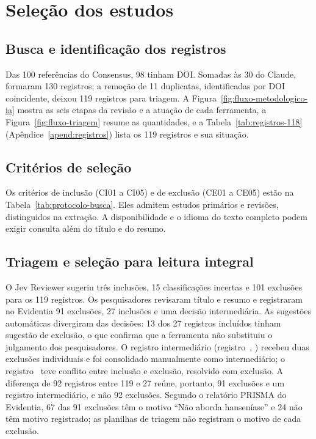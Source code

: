 \section{Seleção dos estudos}
\label{sec:execucao-busca-selecao}

\subsection{Busca e identificação dos registros}

Das 100 referências do Consensus, 98 tinham DOI. Somadas às 30 do Claude,
formaram 130 registros; a remoção de 11 duplicatas, identificadas por DOI
coincidente, deixou 119 registros para triagem. A
Figura~\ref{fig:fluxo-metodologico-ia} mostra as seis etapas da revisão e
a atuação de cada ferramenta, a Figura~\ref{fig:fluxo-triagem} resume as
quantidades, e a Tabela~\ref{tab:registros-118} (Apêndice~\ref{apend:registros}) lista os
119 registros e sua situação.

\subsection{Critérios de seleção}
\label{subsec:criterios-selecao}

Os critérios de inclusão (CI01 a CI05) e de exclusão (CE01 a CE05) estão
na Tabela~\ref{tab:protocolo-busca}. Eles admitem estudos primários e
revisões, distinguidos na extração. A disponibilidade e o idioma do texto
completo podem exigir consulta além do título e do resumo.

\subsection{Triagem e seleção para leitura integral}

O Jev Reviewer sugeriu três inclusões, 15 classificações incertas e 101
exclusões para os 119 registros. Os pesquisadores revisaram título e
resumo e registraram no Evidentia 91 exclusões, 27 inclusões e uma
decisão intermediária. As sugestões automáticas divergiram das decisões:
13 dos 27 registros incluídos tinham sugestão de exclusão, o que confirma
que a ferramenta não substituiu o julgamento dos pesquisadores. O registro
intermediário (registro~, ) recebeu duas
exclusões individuais e foi consolidado manualmente como intermediário; o
registro~ \cite{baweja2016} teve conflito entre inclusão e
exclusão, resolvido com exclusão. A diferença de 92 registros entre 119 e
27 reúne, portanto, 91 exclusões e um registro intermediário, e não 92
exclusões. Segundo o relatório PRISMA do Evidentia, 67 das 91 exclusões
têm o motivo ``Não aborda hanseníase'' e 24 não têm motivo registrado; as
planilhas de triagem não registram o motivo de cada exclusão.

